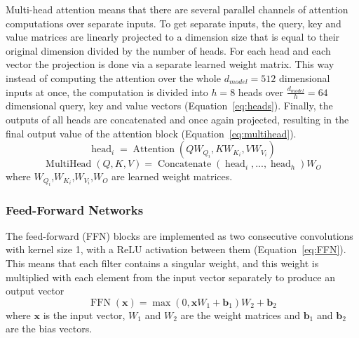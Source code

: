\documentclass[12pt]{article}
\DeclareMathOperator{\Attention}{Attention}
\DeclareMathOperator{\MultiHead}{MultiHead}
\DeclareMathOperator{\Concatenate}{Concatenate}
\DeclareMathOperator{\head}{head}
\DeclareMathOperator{\FFN}{FFN}
\begin{document}
Multi-head attention means that there are several parallel channels of attention computations over separate inputs. To get separate inputs, the query, key and value matrices are linearly projected to a dimension size that is equal to their original dimension divided by the number of heads. For each head and each vector the projection is done via a separate learned weight matrix. This way instead of computing the attention over the whole \(d_{model}=512\) dimensional inputs at once, the computation is divided into \(h=8\) heads over \(\frac{d_{model}}{h}=64\) dimensional query, key and value vectors (Equation~\ref{eq:heads}). Finally, the outputs of all heads are concatenated and once again projected, resulting in the final output value of the attention block (Equation~\ref{eq:multihead}).
\begin{equation}\label{eq:heads}
\head_i=\Attention(QW_{Q_i},KW_{K_i},VW_{V_i})
\end{equation}
\begin{equation} \label{eq:multihead}
\MultiHead(Q,K,V)=\Concatenate(\head_i,...,\head_h)W_O
\end{equation}
where \(W_{Q_i}\),\(W_{K_i}\),\(W_{V_i}\),\(W_{O}\) are learned weight matrices.

\subsubsection{Feed-Forward Networks} \label{sssec:trf_nn}
The feed-forward (FFN) blocks are implemented as two consecutive convolutions with kernel size 1, with a ReLU activation between them (Equation~\ref{eq:FFN}). This means that each filter contains a singular weight, and this weight is multiplied with each element from the input vector separately to produce an output vector
\begin{equation} \label{eq:FFN}
\FFN(\bm{x})=\max(0,\bm{x}W_1+\bm{b}_1)W_2+\bm{b}_2
\end{equation}
where \(\bm{x}\) is the input vector, \(W_1\) and \(W_2\) are the weight matrices and \(\bm{b}_1\) and \(\bm{b}_2\) are the bias vectors.
\end{document}
